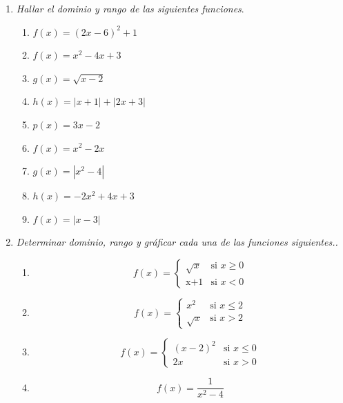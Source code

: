 \documentclass[a4paper,10pt]{article} %
\begin{document}
\begin{enumerate}
\item {\it Hallar el dominio y rango de las siguientes funciones}. 

\begin{enumerate}[label=\textbf{\alph*)}, left=0pt]
\item  $f(x) = (2x-6)^2 + 1$ 
\item \(f(x) = x^2 - 4x + 3\)
\item \(g(x) = \sqrt{x - 2}\)
\item \(h(x) = |x + 1|+|2x + 3|\)
\item \(p(x) = 3x - 2\)
\item \(f(x) = x^2 - 2x\)
\item \(g(x) = |x^2 - 4|\)
\item \(h(x) = -2x^2 + 4x + 3\)
\item \(f(x) = |x - 3|\)

\end{enumerate}


\item {\it Determinar dominio, rango y gráficar cada una de las funciones siguientes..}

\begin{enumerate}
    \item
    
    \[
    f(x) = \begin{cases}
        \sqrt{x} & \text{si } x \geq 0 \\
        \text{x+1} & \text{si } x < 0
    \end{cases}
    \]
 
    
    
    \item
    
    \[
    f(x) = \begin{cases}
        x^2 & \text{si } x \leq 2 \\
        \sqrt{x} & \text{si } x > 2
    \end{cases}
    \]
    
    
    \item 
    
    \[
    f(x) = \begin{cases}
        (x-2)^2 & \text{si } x \leq 0 \\
        2x & \text{si } x > 0
    \end{cases}
    \]
    
    \item 
    
    \[
    f(x) = \frac{1}{x^2 - 4}
    \]

\end{enumerate}


\end{enumerate}
\end{document}
